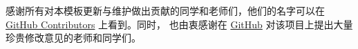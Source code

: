 \begin{acknowledgements}


感谢所有对本模板更新与维护做出贡献的同学和老师们，他们的名字可以在\href{https://github.com/BITNP/BIThesis/graphs/contributors}{GitHub
  Contributors} 上看到。同时， 也由衷感谢在 \href{https://github.com/BITNP/BIThesis/issues?q=}{GitHub}
对该项目上提出大量珍贵修改意见的老师和同学们。


\end{acknowledgements}
